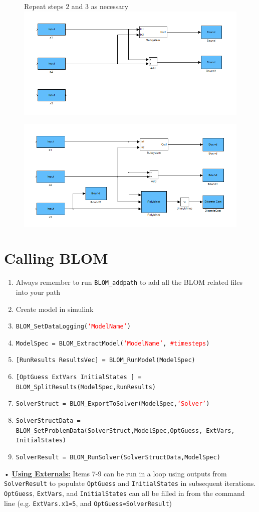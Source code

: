 \documentclass[12pt]{report}
\newcommand{\textbu}[1]{\textbf{\underline{#1}}}
\newcommand{\red}[1]{\textcolor{red}{#1}}
\begin{document}
\begin{figure}[H]
Repeat steps 2 and 3 as necessary
\center
\includegraphics[width=120mm]{figures/Example_Step3_2.png}
\end{figure}
\begin{figure}[H]
\center
\includegraphics[width=120mm]{figures/Example_final.png}
\end{figure}

\section{Calling BLOM}
\begin{enumerate}
\item Always remember to run \texttt{BLOM\_addpath} to add all the BLOM related files into your path
\item Create model in simulink 
\item \texttt{BLOM\_SetDataLogging(\red{`ModelName'})}
\item \texttt{ModelSpec = BLOM\_ExtractModel(\red{`ModelName'}, \red{\#timesteps})}
\item \texttt{[RunResults ResultsVec] = BLOM\_RunModel(ModelSpec)}
\item \texttt{[OptGuess ExtVars InitialStates ] = BLOM\_SplitResults(ModelSpec,RunResults)}
\item \texttt{SolverStruct = BLOM\_ExportToSolver(ModelSpec,\red{`Solver'})}
\item \texttt{SolverStructData =  BLOM\_SetProblemData(SolverStruct,ModelSpec,OptGuess, ExtVars, InitialStates)}
\item \texttt{SolverResult  =  BLOM\_RunSolver(SolverStructData,ModelSpec)}
\end{enumerate}•
\textbu{Using Externals:} Items 7-9 can be run in a loop using outputs from \texttt{SolverResult} to populate \texttt{OptGuess} and \texttt{InitialStates} in subsequent iterations.  \texttt{OptGuess}, \texttt{ExtVars}, and \texttt{InitialStates} can all be filled in from the command line (e.g. \texttt{ExtVars.x1=5}, and \texttt{OptGuess=SolverResult})
\end{document}
